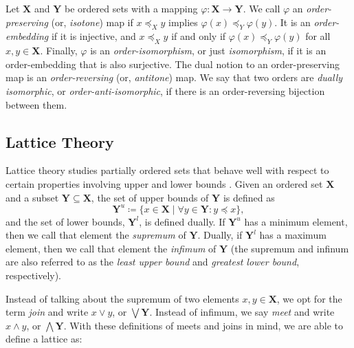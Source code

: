 \begin{definition}
	\label{definition:order-maps}    
	    

	Let $\mathbf{X}$ and $\mathbf{Y}$ be ordered sets with a mapping $\varphi : \mathbf{X}\to \mathbf{Y}$. We call $\varphi$
	an \textit{order-preserving} (or, \textit{isotone}) map if $x \preceq_{X}y$ implies $\varphi(x) \preceq_{Y}\varphi(y)$.
	It is an \textit{order-embedding} if it is injective, and $x \preceq_{X}y$ if and only if $\varphi(x) \preceq_{Y}\varphi
	(y)$ for all $x,y \in \mathbf{X}$. Finally, $\varphi$ is an \textit{order-isomorphism}, or just \textit{isomorphism}, if
	it is an order-embedding that is also surjective. The dual notion to an order-preserving map is an \textit{order-reversing}
	(or, \textit{antitone}) map. We say that two orders are \textit{dually isomorphic}, or \textit{order-anti-isomorphic},
	if there is an order-reversing bijection between them.
\end{definition}

\subsection{Lattice Theory}
\label{subsection:lattice-theory}

Lattice theory studies partially ordered sets that behave well with respect to certain properties involving upper and
lower bounds \cite{davey2002introduction}. Given an ordered set $\mathbf{X}$ and a subset $\mathbf{Y}\subseteq \mathbf{X}$,
the set of upper bounds of $\mathbf{Y}$ is defined as
\[
	\mathbf{Y}^{u}\coloneqq \{x \in \mathbf{X}\mid \forall y \in \mathbf{Y}: y \preceq x\},
\]
and the set of lower bounds, $\mathbf{Y}^{l}$, is defined dually. If $\mathbf{Y}^{u}$ has a minimum element, then we
call that element the \textit{supremum} of $\mathbf{Y}$. Dually, if $\mathbf{Y}^{l}$ has a maximum element, then we call
that element the \textit{infimum} of $\mathbf{Y}$ (the supremum and infinum are also referred to as the \textit{least
upper bound} and \textit{greatest lower bound}, respectively).

    Instead of talking about the supremum
of two elements $x,y \in \mathbf{X}$, we opt for the term \textit{join} and write $x \vee y$, or $\bigvee \mathbf{Y}$.
Instead of infimum, we say \textit{meet} and write $x \wedge y$, or $\textstyle \bigwedge \mathbf{Y}$. With these
definitions of meets and joins in mind, we are able to define a lattice as:

